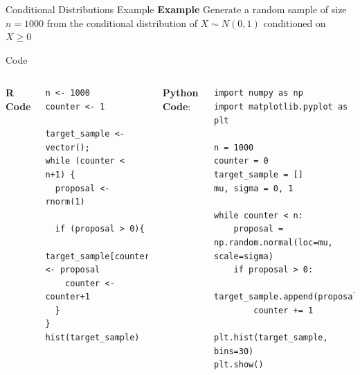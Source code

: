 \documentclass[8pt]{beamer}
\begin{document}
\begin{frame}[fragile]{Conditional Distributions Example}
\textbf{Example} Generate a random sample of size $n=1000$ from the conditional distribution of $X \sim N(0,1) $  conditioned on $X\geq 0$

\vspace{2mm}

\alert{Code}
\begin{columns}
\textbf{R Code}

\begin{lstlisting}
n <- 1000
counter <- 1 

target_sample <- vector();
while (counter < n+1) { 
  proposal <-rnorm(1)
  
  if (proposal > 0){
    target_sample[counter] <- proposal
    counter <- counter+1
  }
}  
hist(target_sample) 
\end{lstlisting}

\textbf{Python Code}:
\begin{lstlisting}
import numpy as np
import matplotlib.pyplot as plt

n = 1000
counter = 0
target_sample = []
mu, sigma = 0, 1

while counter < n:
    proposal = np.random.normal(loc=mu, scale=sigma)
    if proposal > 0:
        target_sample.append(proposal)
        counter += 1
        
plt.hist(target_sample, bins=30)
plt.show()
\end{lstlisting}
\end{columns}
\end{frame}
\end{document}
